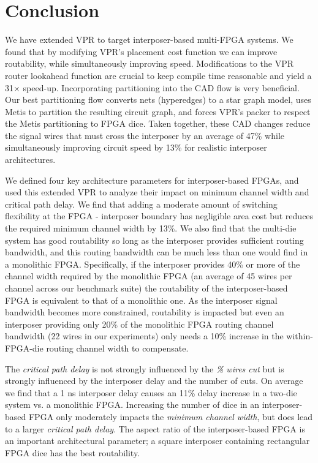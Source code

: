 \documentclass[journal]{IEEEtran}
\begin{document}
\section{Conclusion}
\label{conclusionSection}
We have extended VPR to target interposer-based multi-FPGA systems. We found that by modifying VPR's placement cost function we can improve routability, while simultaneously improving speed. Modifications to the VPR router lookahead function are crucial to keep compile time reasonable and yield a 31$\times$ speed-up. Incorporating partitioning into the CAD flow is very beneficial. Our best partitioning flow converts nets (hyperedges) to a star graph model, uses Metis to partition the resulting circuit graph, and forces VPR's packer to respect the Metis partitioning to FPGA dice. Taken together, these CAD changes reduce the signal wires that must cross the interposer by an average of 47\% while simultaneously improving circuit speed by 13\% for realistic interposer architectures.

We defined four key architecture parameters for interposer-based FPGAs, and used this extended VPR to analyze their impact on minimum channel width and critical path delay. We find that adding a moderate amount of switching flexibility at the FPGA - interposer boundary has negligible area cost but reduces the required minimum channel width by 13\%. We also find that the multi-die system has good routability so long as the interposer provides sufficient routing bandwidth, and this routing bandwidth can be much less than one would find in a monolithic FPGA. Specifically, if the interposer provides 40\% or more of the channel width required by the monolithic FPGA (an average of 45 wires per channel across our benchmark suite) the routability of the interposer-based FPGA is equivalent to that of a monolithic one. As the interposer signal bandwidth becomes more constrained, routability is impacted but even an interposer providing only 20\% of the monolithic FPGA routing channel bandwidth (22 wires in our experiments) only needs a 10\% increase in the within-FPGA-die routing channel width to compensate.

The \textit{critical path delay} is not strongly influenced by the \textit{\% wires cut} but is strongly influenced by the interposer delay and the number of cuts. On average we find that a 1 ns interposer delay causes an 11\% delay increase in a two-die system vs. a monolithic FPGA. Increasing the number of dice in an interposer-based FPGA only moderately impacts the \textit{minimum channel width}, but does lead to a larger \textit{critical path delay}. The aspect ratio of the interposer-based FPGA is an important architectural parameter; a square interposer containing rectangular FPGA dice has the best routability.
\end{document}
